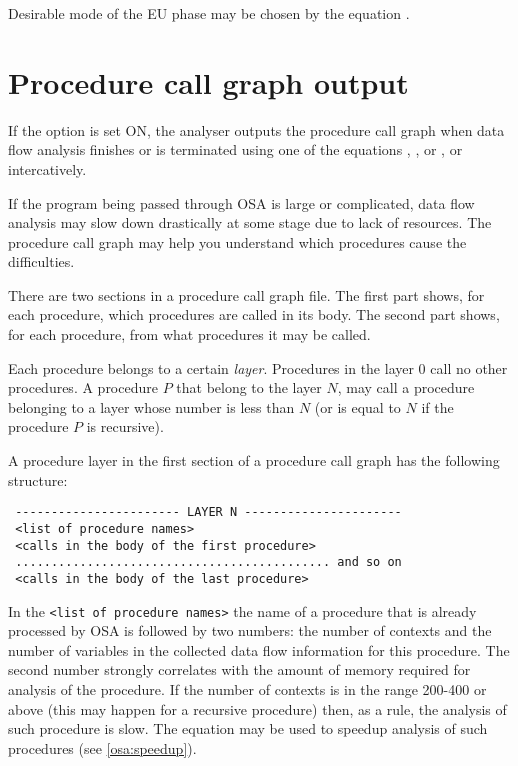 Desirable mode of the EU phase may be chosen by the equation . 


\section{Procedure call graph output}
\label{osa:graph}

If the option  is set ON, the analyser outputs the procedure
call graph when data flow analysis finishes or is terminated using
one of the equations , , or ,
or intercatively.

If the program being passed through OSA is large or complicated, 
data flow analysis may slow down drastically at some stage 
due to lack of resources. The procedure call graph may help you 
understand which procedures cause the difficulties.

There are two sections in a procedure call graph file.
The first part shows, for each procedure, which procedures are 
called in its body. The second part shows, for each procedure, 
from what procedures it may be called.

Each procedure belongs to a certain {\em layer}. 
Procedures in the layer 0 call no other procedures.
A procedure $P$ that belong to the layer $N$, may call 
a procedure belonging to a layer whose number is less than $N$ 
(or is equal to $N$ if the procedure $P$ is recursive).

A procedure layer in the first section of a procedure call graph
has the following structure: 

\begin{verbatim}
 ----------------------- LAYER N ----------------------
 <list of procedure names>
 <calls in the body of the first procedure>
 ............................................ and so on
 <calls in the body of the last procedure>
\end{verbatim}

In the \verb'<list of procedure names>' the name of a procedure that
is already processed by OSA is followed by two numbers: the number of
contexts and the number of variables in the collected data flow information
for this procedure. The second number strongly correlates
with the amount of memory required for analysis of the procedure.
If the number of contexts is in the range 200-400 or above (this may happen 
for a recursive procedure) then, as a rule, the analysis of such 
procedure is slow. The equation  may be used to speedup
analysis of such procedures (see \ref{osa:speedup}).

